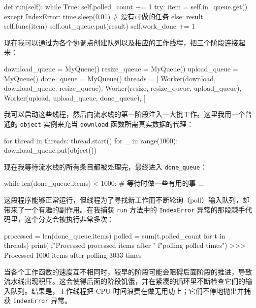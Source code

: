 \begin{codebox}[python]
    def run(self):
        while True:
            self.polled_count += 1
            try:
                item = self.in_queue.get()
            except IndexError:
                time.sleep(0.01)  # 没有可做的任务
            else:
                result = self.func(item)
                self.out_queue.put(result)
                self.work_done += 1
\end{codebox}

现在我可以通过为各个协调点创建队列以及相应的工作线程，把三个阶段连接起来：

\begin{codebox}[python]
download_queue = MyQueue()
resize_queue = MyQueue()
upload_queue = MyQueue()
done_queue = MyQueue()
threads = [
    Worker(download, download_queue, resize_queue),
    Worker(resize, resize_queue, upload_queue),
    Worker(upload, upload_queue, done_queue),
]
\end{codebox}

我可以启动这些线程，然后向流水线的第一阶段注入一大批工作。这里我用一个普通的 \texttt{object} 实例来充当 \texttt{download} 函数所需真实数据的代理：

\begin{codebox}[python]
for thread in threads:
    thread.start()
for _ in range(1000):
    download_queue.put(object())
\end{codebox}

现在我等待流水线的所有条目都被处理完，最终进入 \texttt{done\_queue}：

\begin{codebox}[python]
while len(done_queue.items) < 1000:
    # 等待时做一些有用的事
    ...
\end{codebox}

这段程序能够正常运行，但线程为了寻找新工作而不断轮询（poll）输入队列，却带来了一个有趣的副作用。在我捕获 \texttt{run} 方法中的 \texttt{IndexError} 异常的那段棘手代码里，这个分支会被执行非常多次：

\begin{codebox}[python]
processed = len(done_queue.items)
polled = sum(t.polled_count for t in threads)
print( f"Processed {processed} items after "
f"polling {polled} times")
>>>
Processed 1000 items after polling 3033 times
\end{codebox}

当各个工作函数的速度互不相同时，较早的阶段可能会阻碍后面阶段的推进，导致流水线出现积压。这会使得后面的阶段饥饿，并在紧凑的循环里不断检查它们的输入队列。结果是，工作线程把 CPU 时间浪费在做无用功上；它们不停地抛出并捕获 \texttt{IndexError} 异常。

